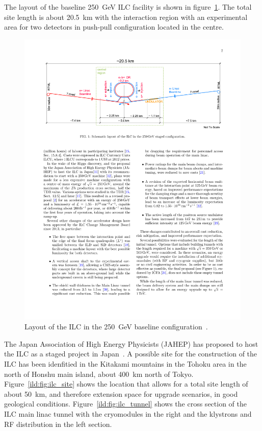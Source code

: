 The layout of the baseline 250~GeV ILC facility is shown in figure~\ref{ild:fig:ilc_footprint}. The total site length is about 20.5~km with the interaction region with an experimental area for two detectors in push-pull configuration located in the centre.
\begin{figure}[h!]
\centering
\includegraphics[width=0.9\hsize]{ILC/figs/ILC_Footprint.pdf}

\caption{\label{ild:fig:ilc_footprint}Layout of the ILC in the 250~GeV baseline configuration~\cite{Bambade:2019fyw}.}
\end{figure}
The Japan Association of High Energy Physicists (JAHEP) has proposed to host the ILC as a staged project in Japan~\cite{ild:bib:JAHEP}. A possible site for the construction of the ILC has been idenfitied in the Kitakami mountains in the Tohoku area in the north of Honshu main island, about 400~km north of Tokyo. Figure~\ref{ild:fig:ilc_site} shows the location that allows for a total site length of about 50~km, and therefore extension space for upgrade scenarios, in good geological conditions. Figure~\ref{ild:fig:ilc_tunnel} shows the cross section of the ILC main linac tunnel with the cryomodules in the right and the klystrons and RF distribution in the left section.
